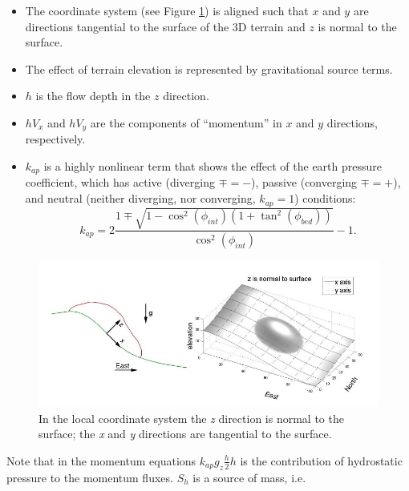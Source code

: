 \documentclass[review]{elsarticle}
\begin{document}
\begin{itemize}
        \item The coordinate system (see Figure \ref{xzeast}) is aligned such that $x$ and $y$ are directions tangential  
              to the surface of the 3D terrain and $z$ is normal to the surface.
        \item The effect of terrain elevation is represented by gravitational source terms. 
        \item $h$ is the flow depth in the $z$ direction.
        \item $hV_x$ and $hV_y$ are the components of ``momentum'' in $x$ and $y$ directions, respectively.
        \item{ $k_{ap}$ is a highly nonlinear term that shows the effect of the earth pressure coefficient, which has active 
              (diverging $\mp=-$), passive (converging $\mp=+$), and neutral (neither diverging, nor converging, $k_{ap}=1$) conditions:
              \begin{equation}
                        k_{ap}=2\frac{1\mp\sqrt{1-\cos^2(\phi_{int})\left(1+\tan^2(\phi_{bed})\right)}}{\cos^2(\phi_{int})}-1.
                \end{equation}
             }
             
\end{itemize}
\begin{figure}[!t]
        \begin{center}
                 \includegraphics[width=1\textwidth]{IMAGES/1.jpg}
                \caption{In the local coordinate system the {\itshape z} direction is normal to the surface; 
                the {\itshape x} and {\itshape y} directions are tangential to the surface.}
                \label{xzeast}
        \end{center}
\end{figure}
Note that in the momentum equations $k_{ap}g_z\frac{h}{2}h$ is the contribution of hydrostatic 
pressure to the momentum fluxes. $S_h$ is a source of mass, i.e. 
\end{document}
